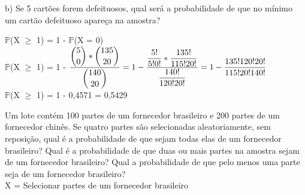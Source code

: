 \documentclass[12pt,a4paper,draft]{article}
\begin{document}
	\vspace{1cm}
	b) Se 5 cartões forem defeituosos, qual será a probabilidade de que no mínimo um cartão defeituoso apareça na amostra?
	\begin{center}
		\vspace{0.5cm}
		$\mathbb{P}$(X $\geq$ 1) = 1 - $\mathbb{P}$(X = 0)
		\vspace{0.5cm}\\
		$\mathbb{P}$(X $\geq$ 1) = 1 - $\dfrac{\dbinom{5}{0} * \dbinom{135}{20}}{\dbinom{140}{20}} = 1 - \dfrac{\dfrac{5!}{5!0!} * \dfrac{135!}{115!20!}}{\dfrac{140!}{120!20!}} = 1 - \dfrac{135!120!20!}{115!20!140!}$
		\vspace{0.5cm}\\
		$\mathbb{P}$(X $\geq$ 1) = 1 - 0,4571 = 0,5429
	\end{center}
	\vspace{1cm}
	Um lote contém 100 partes de um fornecedor brasileiro e 200 partes de um fornecedor chinês. Se quatro partes são selecionadas aleatoriamente, sem	reposição, qual é a probabilidade de que sejam todas elas de um fornecedor	brasileiro? Qual é a probabilidade de que duas ou mais partes na amostra sejam de um fornecedor brasileiro? Qual a probabilidade de que pelo menos uma parte seja de um fornecedor brasileiro?
	\vspace{0.5cm}\\
	X = Selecionar partes de um fornecedor brasileiro
\end{document}
